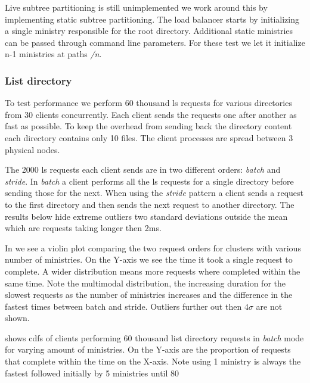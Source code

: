 Live subtree partitioning is still unimplemented we work around this by implementing static subtree partitioning. The load balancer starts by initializing a single ministry responsible for the root directory. Additional static ministries can be passed through command line parameters. For these test we let it initialize n-1 ministries at paths \textsl{/n}.

\subsubsection{List directory}
To test performance we perform 60 thousand ls requests for various directories from 30 clients concurrently. Each client sends the requests one after another as fast as possible. To keep the overhead from sending back the directory content each directory contains only 10 files. The client processes are spread between 3 physical nodes.

The 2000 ls requests each client sends are in two different orders: \textit{batch} and \textit{stride}. In \textit{batch} a client performs all the ls requests for a single directory before sending those for the next. When using the \textit{stride} pattern a client sends a request to the first directory and then sends the next request to another directory. The results below hide extreme outliers two standard deviations outside the mean which are requests taking longer then 2ms.

In  we see a violin plot comparing the two request orders for clusters with various number of ministries. On the Y-axis we see the time it took a single request to complete. A wider distribution means more requests where completed within the same time. Note the multimodal distribution, the increasing duration for the slowest requests as the number of ministries increases and the difference in the fastest times between batch and stride. Outliers further out then $4\sigma$ are not shown.

 shows \acp{cdf} of clients performing 60 thousand list directory requests in \textit{batch} mode for varying amount of ministries. On the Y-axis are the proportion of requests that complete within the time on the X-axis. Note using 1 ministry is always the fastest followed initially by 5 ministries until 80%

